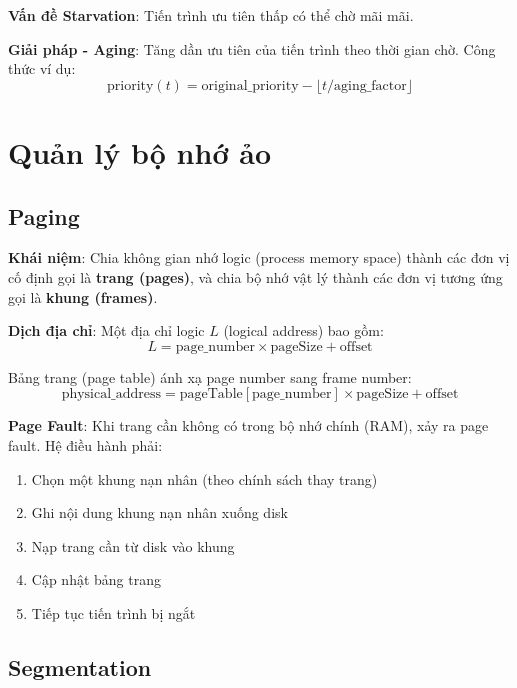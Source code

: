 \textbf{Vấn đề Starvation}: Tiến trình ưu tiên thấp có thể chờ mãi mãi.

\textbf{Giải pháp - Aging}: Tăng dần ưu tiên của tiến trình theo thời gian chờ. 
Công thức ví dụ:
\begin{equation}
\text{priority}(t) = \text{original\_priority} - \lfloor t / \text{aging\_factor} \rfloor
\end{equation}

\section{Quản lý bộ nhớ ảo}

\subsection{Paging}

\textbf{Khái niệm}: Chia không gian nhớ logic (process memory space) thành các đơn vị 
cố định gọi là \textbf{trang (pages)}, và chia bộ nhớ vật lý thành các đơn vị 
tương ứng gọi là \textbf{khung (frames)}.

\textbf{Dịch địa chỉ}:
Một địa chỉ logic $L$ (logical address) bao gồm:
\begin{equation}
L = \text{page\_number} \times \text{pageSize} + \text{offset}
\end{equation}

Bảng trang (page table) ánh xạ page number sang frame number:
\begin{equation}
\text{physical\_address} = \text{pageTable}[\text{page\_number}] \times \text{pageSize} + \text{offset}
\end{equation}

\textbf{Page Fault}: Khi trang cần không có trong bộ nhớ chính (RAM), xảy ra page fault. 
Hệ điều hành phải:
\begin{enumerate}[leftmargin=1.5cm]
  \item Chọn một khung nạn nhân (theo chính sách thay trang)
  \item Ghi nội dung khung nạn nhân xuống disk
  \item Nạp trang cần từ disk vào khung
  \item Cập nhật bảng trang
  \item Tiếp tục tiến trình bị ngắt
\end{enumerate}

\subsection{Segmentation}

